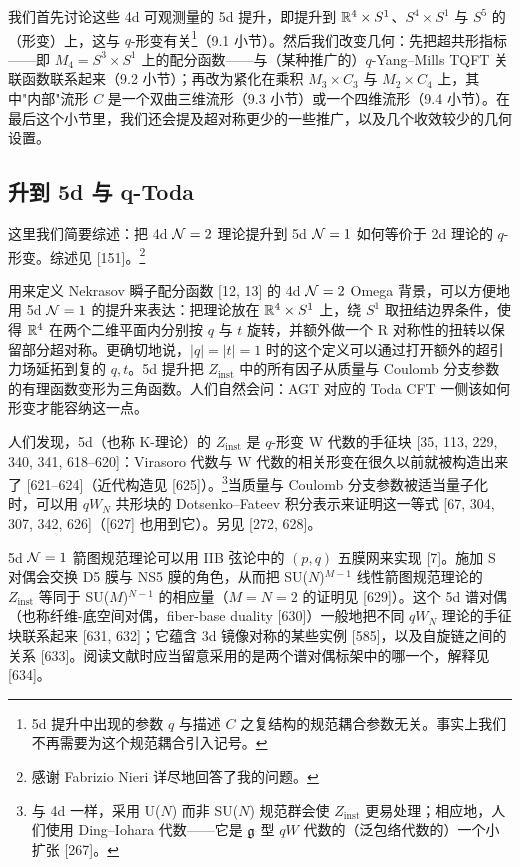 我们首先讨论这些 4d 可观测量的 5d 提升，即提升到 $\mathbb{R}^4\times S^1$、$S^4\times S^1$ 与 $S^5$ 的（形变）上，这与 $q$-形变有关\footnote{5d 提升中出现的参数 $q$ 与描述 $C$ 之复结构的规范耦合参数无关。事实上我们不再需要为这个规范耦合引入记号。}（9.1 小节）。然后我们改变几何：先把超共形指标------即 $M_4=S^3\times S^1$ 上的配分函数------与（某种推广的）$q$-Yang--Mills TQFT 关联函数联系起来（9.2 小节）；再改为紧化在乘积 $M_3\times C_3$ 与 $M_2\times C_4$ 上，其中"内部"流形 $C$ 是一个双曲三维流形（9.3 小节）或一个四维流形（9.4 小节）。在最后这个小节里，我们还会提及超对称更少的一些推广，以及几个收效较少的几何设置。

\subsection{升到 5d 与 q-Toda}

这里我们简要综述：把 4d $\mathcal{N}=2$ 理论提升到 5d $\mathcal{N}=1$ 如何等价于 2d 理论的 $q$-形变。综述见 [151]。\footnote{感谢 Fabrizio Nieri 详尽地回答了我的问题。}

用来定义 Nekrasov 瞬子配分函数 [12, 13] 的 4d $\mathcal{N}=2$ Omega 背景，可以方便地用 5d $\mathcal{N}=1$ 的提升来表达：把理论放在 $\mathbb{R}^4\times S^1$ 上，绕 $S^1$ 取扭结边界条件，使得 $\mathbb{R}^4$ 在两个二维平面内分别按 $q$ 与 $t$ 旋转，并额外做一个 R 对称性的扭转以保留部分超对称。更确切地说，$|q|=|t|=1$ 时的这个定义可以通过打开额外的超引力场延拓到复的 $q,t$。5d 提升把 $Z_{\text{inst}}$ 中的所有因子从质量与 Coulomb 分支参数的有理函数变形为三角函数。人们自然会问：AGT 对应的 Toda CFT 一侧该如何形变才能容纳这一点。

人们发现，5d（也称 K-理论）的 $Z_{\text{inst}}$ 是 $q$-形变 W 代数的手征块 [35, 113, 229, 340, 341, 618--620]：Virasoro 代数与 W 代数的相关形变在很久以前就被构造出来了 [621--624]（近代构造见 [625]）。\footnote{与 4d 一样，采用 U($N$) 而非 SU($N$) 规范群会使 $Z_{\text{inst}}$ 更易处理；相应地，人们使用 Ding--Iohara 代数------它是 $\mathfrak{g}$ 型 $qW$ 代数的（泛包络代数的）一个小扩张 [267]。}当质量与 Coulomb 分支参数被适当量子化时，可以用 $qW_N$ 共形块的 Dotsenko--Fateev 积分表示来证明这一等式 [67, 304, 307, 342, 626]（[627] 也用到它）。另见 [272, 628]。

5d $\mathcal{N}=1$ 箭图规范理论可以用 IIB 弦论中的 $(p,q)$ 五膜网来实现 [7]。施加 S 对偶会交换 D5 膜与 NS5 膜的角色，从而把 SU($N$)$^{M-1}$ 线性箭图规范理论的 $Z_{\text{inst}}$ 等同于 SU($M$)$^{N-1}$ 的相应量（$M=N=2$ 的证明见 [629]）。这个 5d 谱对偶（也称纤维-底空间对偶，fiber-base duality [630]）一般地把不同 $qW_N$ 理论的手征块联系起来 [631, 632]；它蕴含 3d 镜像对称的某些实例 [585]，以及自旋链之间的关系 [633]。阅读文献时应当留意采用的是两个谱对偶标架中的哪一个，解释见 [634]。

